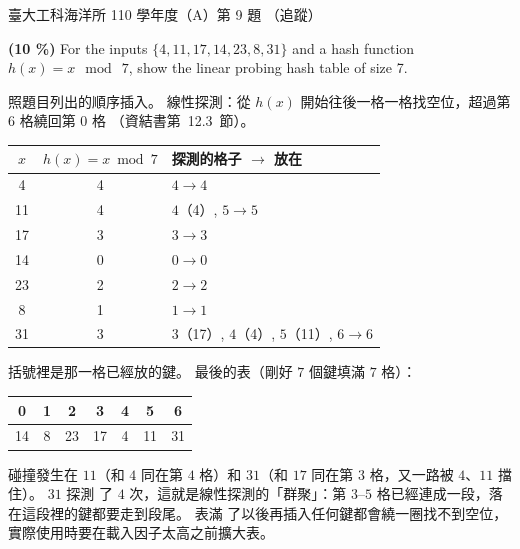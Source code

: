 \begin{pastexam}[label={px:ntu-110-esoe-ds-09}]{臺大工科海洋所 110 學年度（A）第 9 題}
（追蹤）

\textbf{(10 \%)} For the inputs $\{4,11,17,14,23,8,31\}$ and a hash function $h(x)=x\ \bmod\ 7$, show
the linear probing hash table of size 7.
\end{pastexam}

\begin{pastsoln}
照題目列出的順序插入。 線性探測：從 $h(x)$ 開始往後一格一格找空位，超過第 $6$ 格繞回第 $0$ 格
（資結書第~12.3~節）。
\begin{center}
\begin{tabular}{ccl}
\toprule
$x$ & $h(x) = x \bmod 7$ & 探測的格子 $\to$ 放在 \\
\midrule
4 & 4 & $4 \to 4$ \\
11 & 4 & $4$（4）, $5 \to 5$ \\
17 & 3 & $3 \to 3$ \\
14 & 0 & $0 \to 0$ \\
23 & 2 & $2 \to 2$ \\
8 & 1 & $1 \to 1$ \\
31 & 3 & $3$（17）, $4$（4）, $5$（11）, $6 \to 6$ \\
\bottomrule
\end{tabular}
\end{center}
括號裡是那一格已經放的鍵。 最後的表（剛好 $7$ 個鍵填滿 $7$ 格）：
\begin{center}
\begin{tabular}{*{7}{c}}
\toprule
0 & 1 & 2 & 3 & 4 & 5 & 6 \\
\midrule
14 & 8 & 23 & 17 & 4 & 11 & 31 \\
\bottomrule
\end{tabular}
\end{center}
碰撞發生在 $11$（和 $4$ 同在第 $4$ 格）和 $31$（和 $17$ 同在第 $3$ 格，又一路被 $4$、$11$ 擋住）。 $31$ 探測
了 $4$ 次，這就是線性探測的「群聚」：第 $3$--$5$ 格已經連成一段，落在這段裡的鍵都要走到段尾。 表滿
了以後再插入任何鍵都會繞一圈找不到空位，實際使用時要在載入因子太高之前擴大表。
\end{pastsoln}
